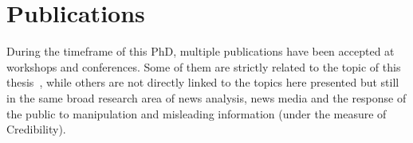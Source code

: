 





\section{\statusgreen Publications}
\label{sec:intro_publications}

During the timeframe of this PhD, multiple publications have been accepted at workshops and conferences. Some of them are strictly related to the topic of this thesis~\citep{mensio2020towards,mensio2020one}, while others are not directly linked to the topics here presented but still in the same broad research area of news analysis, news media and the response of the public to manipulation and misleading information (under the measure of Credibility).




